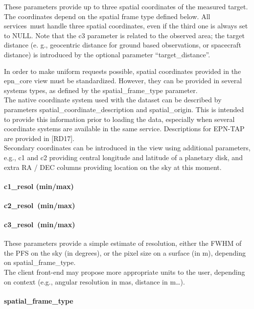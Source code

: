 \documentclass[11pt,a4paper]{ivoa}
\begin{document}
These parameters provide up to three spatial coordinates of the measured target. The coordinates depend on the spatial frame type defined below. All services must handle three spatial coordinates, even if the third one is always set to NULL. Note that the c3 parameter is related to the observed area; the target distance (e. g., geocentric distance for ground based observations, or spacecraft distance) is introduced by the optional parameter ``target\_distance''.

In order to make uniform requests possible, spatial coordinates provided in the epn\_core view must be standardized. However, they can be provided in several systems types, as defined by the spatial\_frame\_type parameter. \\The native coordinate system used with the dataset can be described by parameters spatial\_coordinate\_description and spatial\_origin. This is intended to provide this information prior to loading the data, especially when several coordinate systems are available in the same service. Descriptions for EPN-TAP are provided in [RD17]. \\ Secondary coordinates can be introduced in the view using additional parameters, e.g., c1 and c2 providing central longitude and latitude of a planetary disk, and extra RA / DEC columns providing location on the sky at this moment.

\paragraph{c1\_resol (min/max)}

\paragraph{c2\_resol (min/max)}

\paragraph{c3\_resol (min/max)}

These parameters provide a simple estimate of resolution, either the FWHM of the PFS on the sky (in degrees), or the pixel size on a surface (in m), depending on spatial\_frame\_type. \\ The client front-end may propose more appropriate units to the user, depending on context (e.g., angular resolution in mas, distance in m…).

\paragraph{spatial\_frame\_type}
\end{document}
